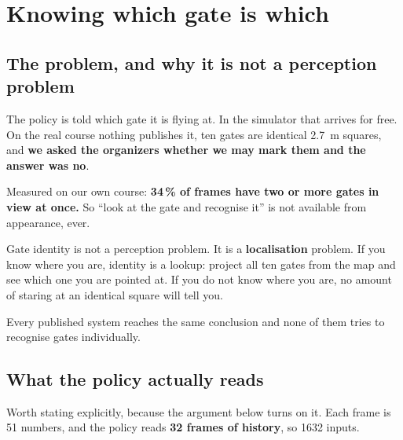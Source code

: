 \section{Knowing which gate is which}\label{sec:identity}

\subsection{The problem, and why it is not a perception problem}

The policy is told which gate it is flying at. In the simulator that arrives for
free. On the real course nothing publishes it, ten gates are identical
\SI{2.7}{m} squares, and \textbf{we asked the organizers whether we may mark them
and the answer was no}.

Measured on our own course: \textbf{34\,\% of frames have two or more gates in
view at once.} So ``look at the gate and recognise it'' is not available from
appearance, ever.

\begin{explain}
Gate identity is not a perception problem. It is a \textbf{localisation}
problem. If you know where you are, identity is a lookup: project all ten gates
from the map and see which one you are pointed at. If you do not know where you
are, no amount of staring at an identical square will tell you.

Every published system reaches the same conclusion and none of them tries to
recognise gates individually.
\end{explain}

\subsection{What the policy actually reads}\label{sec:statevector}

Worth stating explicitly, because the argument below turns on it. Each frame is
51 numbers, and the policy reads \textbf{32 frames of history}, so 1632 inputs.

